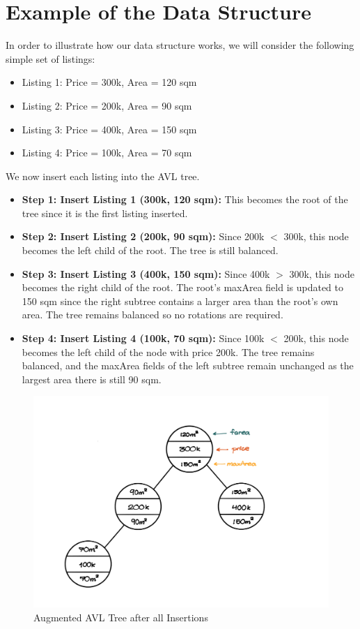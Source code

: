 \documentclass[11pt, a4paper]{article}
\begin{document}
\section*{Example of the Data Structure}

In order to illustrate how our data structure works, we will consider the following simple set of listings: 
\begin{itemize}
    \item Listing 1: Price = 300k, Area = 120 sqm
    \item Listing 2: Price = 200k, Area = 90 sqm
    \item Listing 3: Price = 400k, Area = 150 sqm
    \item Listing 4: Price = 100k, Area = 70 sqm
\end{itemize}

We now insert each listing into the AVL tree.

\begin{itemize}
    \item \textbf{Step 1: Insert Listing 1 (300k, 120 sqm):} This becomes the root of the tree since it is the first listing inserted.
    \item \textbf{Step 2: Insert Listing 2 (200k, 90 sqm):} Since 200k $<$  300k, this node becomes the left child of the root. The tree is still balanced.
    \item \textbf{Step 3: Insert Listing 3 (400k, 150 sqm):} Since 400k $>$ 300k, this node becomes the right child of the root. The root’s maxArea field is updated to 150 sqm since the right subtree contains a larger area than the root’s own area. The tree remains balanced so no rotations are required.
    \item \textbf{Step 4: Insert Listing 4 (100k, 70 sqm):} Since 100k $<$ 200k, this node becomes the left child of the node with price 200k. The tree remains balanced, and the maxArea fields of the left subtree remain unchanged as the largest area there is still 90 sqm.
\end{itemize}

\begin{figure}
    \centering
    \includegraphics[width=0.5\linewidth]{data_struct_a3.jpeg}
    \caption{Augmented AVL Tree after all Insertions}
    \label{fig:enter-label}
\end{figure}
\end{document}
